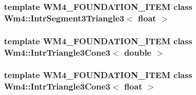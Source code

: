 \subsubsection{\setlength{\rightskip}{0pt plus 5cm}template WM4\_\-FOUNDATION\_\-ITEM class {\bf Wm4::Intr\-Segment3Triangle3}$<$ float $>$}\label{namespaceWm4_93c724e9a8b7ffcf7b3e0a028006b4ec}


\subsubsection{\setlength{\rightskip}{0pt plus 5cm}template WM4\_\-FOUNDATION\_\-ITEM class {\bf Wm4::Intr\-Triangle3Cone3}$<$ double $>$}\label{namespaceWm4_a06663b33f891e4a7a4c5f3bfa6a1bf6}


\subsubsection{\setlength{\rightskip}{0pt plus 5cm}template WM4\_\-FOUNDATION\_\-ITEM class {\bf Wm4::Intr\-Triangle3Cone3}$<$ float $>$}\label{namespaceWm4_b815f6b91e3e1f2c6cc84eb8d0194975}


